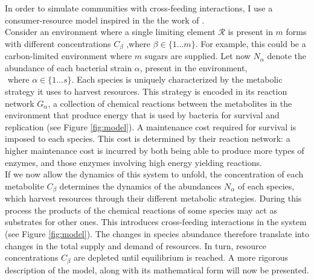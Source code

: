 \documentclass[titlepage,11pt]{article}
\begin{document}
\begin{linenumbers}
\begin{singlespace}
				In order to simulate communities with cross-feeding interactions, I use a consumer-resource model inspired in the the work of \citep{Marsland2019}.\\
				Consider an environment where a single limiting element $ \mathcal{R} $ is present in $ m $ forms with different concentrations $ C_{\beta} \text{ ,where } \beta \in \{1 \dots m\} $. For example, this could be a carbon-limited environment where $ m $ sugars are supplied. Let now $ N_{\alpha} $ denote the abundance of each bacterial strain $ \alpha $,  present in the environment, $ \text{ where } \alpha \in \{1 \dots s\} $. Each species is uniquely characterized by the metabolic strategy it uses to harvest resources. This strategy is encoded in its reaction network $ G_{\alpha} $, a collection of chemical reactions between the metabolites in the environment that produce energy that is used by bacteria for survival and replication (see Figure \ref{fig:model}). A maintenance cost required for survival is imposed to each species. This cost is determined by their reaction network: a higher maintenance cost is incurred by both being able to produce more types of enzymes, and those enzymes involving high energy yielding reactions.\\
				If we now allow the dynamics of this system to unfold, the concentration of each metabolite $ C_\beta $ determines the dynamics of the abundances $ N_\alpha$ of each species, which harvest resources through their different metabolic strategies. During this process the products of the chemical reactions of some species may act as substrates for other ones. This introduces cross-feeding interactions in the system (see Figure \ref{fig:model}). The changes in species abundance therefore translate into changes in the total supply and demand of resources. In turn,  resource concentrations $ C_{\beta} $ are depleted until equilibrium is reached. A more rigorous description of the model, along with its mathematical form will now be presented.\\
	

\end{singlespace}
\end{linenumbers}
\end{document}
